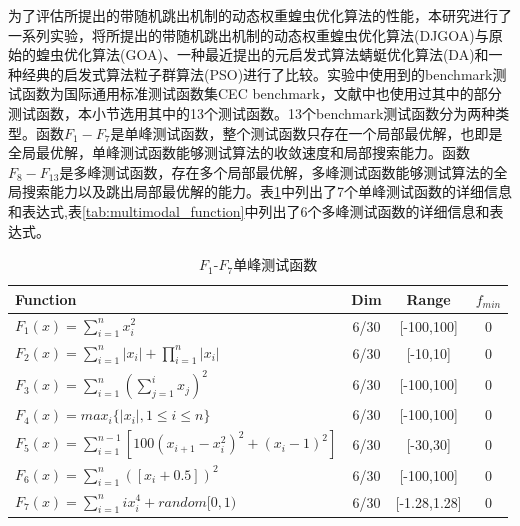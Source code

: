 为了评估所提出的带随机跳出机制的动态权重蝗虫优化算法的性能，本研究进行了一系列实验，将所提出的带随机跳出机制的动态权重蝗虫优化算法(DJGOA)与原始的蝗虫优化算法(GOA)、一种最近提出的元启发式算法蜻蜓优化算法(DA)和一种经典的启发式算法粒子群算法(PSO)进行了比较。实验中使用到的benchmark测试函数为国际通用标准测试函数集CEC benchmark\cite{molga2005test}，文献\cite{saremi2017grasshopper}中也使用过其中的部分测试函数，本小节选用其中的13个测试函数。13个benchmark测试函数分为两种类型。函数$F_1-F_7$是单峰测试函数，整个测试函数只存在一个局部最优解，也即是全局最优解，单峰测试函数能够测试算法的收敛速度和局部搜索能力。函数$F_8-F_{13}$是多峰测试函数，存在多个局部最优解，多峰测试函数能够测试算法的全局搜索能力以及跳出局部最优解的能力。表\ref{tab:unimodal_function}中列出了7个单峰测试函数的详细信息和表达式,表\ref{tab:multimodal_function}中列出了6个多峰测试函数的详细信息和表达式。
\begin{table}[!htbp]
    \centering
    \caption{$F_1$-$F_7$单峰测试函数}
    \label{tab:unimodal_function}
    \renewcommand\arraystretch{1.5} 
\begin{tabular}{l c c c}
  \hline
  Function & Dim & Range & $f_{min}$ \\
  \hline
  $F_1(x)=\sum_{i=1}^n x_i^2$ & 6/30 & [-100,100]&0 \\
  \hline
  $F_2(x)=\sum_{i=1}^n\left|x_i\right|+\prod_{i=1}^n\left|x_i\right|$& 6/30 & [-10,10]&0 \\
  \hline
  $F_3(x)=\sum_{i=1}^n(\sum_{j=1}^ix_j)^2$& 6/30 & [-100,100] & 0\\
  \hline
  $F_4(x)=max_i\{\left|x_i\right|,1\leq i\leq n\}$& 6/30 & [-100,100] & 0\\
  \hline
  $F_5(x)=\sum_{i=1}^{n-1}[100(x_{i+1}-x_i^2)^2+(x_i-1)^2]$& 6/30 & [-30,30] & 0\\
  \hline
  $F_6(x)=\sum_{i=1}^n([x_i+0.5])^2$& 6/30 & [-100,100] & 0\\
  \hline
  $F_7(x)=\sum_{i=1}^n ix_i^4 + random[0,1)$& 6/30 & [-1.28,1.28] & 0\\
  \hline
\end{tabular}
\end{table}


